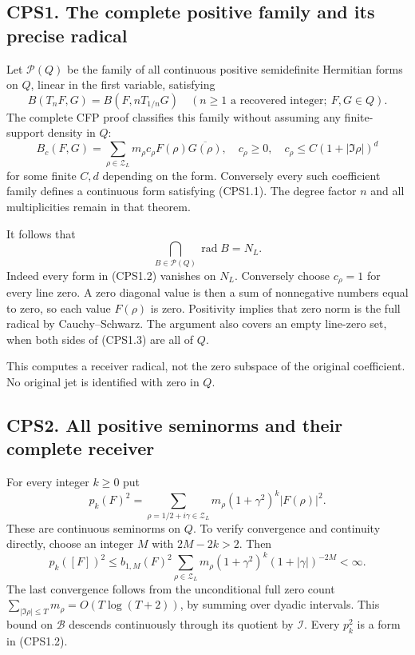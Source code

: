 \subsection{CPS1. The complete positive family and its precise
radical}\label{cps1.-the-complete-positive-family-and-its-precise-radical}

Let \(\mathscr P(Q)\) be the family of all continuous positive
semidefinite Hermitian forms on \(Q\), linear in the first variable,
satisfying \[
B(T_nF,G)=B(F,nT_{1/n}G)
\quad(n\ge1\text{ a recovered integer};\ F,G\in Q).
\tag{CPS1.1}
\] The complete CFP proof classifies this family without assuming any
finite-support density in \(Q\): \[
B_c(F,G)=\sum_{\rho\in\mathscr Z_L}
m_\rho c_\rho F(\rho)\overline{G(\rho)},
\quad c_\rho\ge0,\quad
c_\rho\le C(1+|\Im\rho|)^d
\tag{CPS1.2}
\] for some finite \(C,d\) depending on the form. Conversely every such
coefficient family defines a continuous form satisfying (CPS1.1). The
degree factor \(n\) and all multiplicities remain in that theorem.

It follows that \[
\bigcap_{B\in\mathscr P(Q)}\operatorname{rad}B=N_L.
\tag{CPS1.3}
\] Indeed every form in (CPS1.2) vanishes on \(N_L\). Conversely choose
\(c_\rho=1\) for every line zero. A zero diagonal value is then a sum of
nonnegative numbers equal to zero, so each value \(F(\rho)\) is zero.
Positivity implies that zero norm is the full radical by
Cauchy--Schwarz. The argument also covers an empty line-zero set, when
both sides of (CPS1.3) are all of \(Q\).

This computes a receiver radical, not the zero subspace of the original
coefficient. No original jet is identified with zero in \(Q\).

\subsection{CPS2. All positive seminorms and their complete
receiver}\label{cps2.-all-positive-seminorms-and-their-complete-receiver}

For every integer \(k\ge0\) put \[
p_k(F)^2=\sum_{\rho=1/2+i\gamma\in\mathscr Z_L}
m_\rho(1+\gamma^2)^k|F(\rho)|^2.
\tag{CPS2.1}
\] These are continuous seminorms on \(Q\). To verify convergence and
continuity directly, choose an integer \(M\) with \(2M-2k>2\). Then \[
p_k([F])^2\le b_{1,M}(F)^2
\sum_{\rho\in\mathscr Z_L}m_\rho(1+\gamma^2)^k
(1+|\gamma|)^{-2M}<\infty.
\tag{CPS2.2}
\] The last convergence follows from the unconditional full zero count
\(\sum_{|\Im\rho|\le T}m_\rho=O(T\log(T+2))\), by summing over dyadic
intervals. This bound on \(\mathcal B\) descends continuously through
its quotient by \(\mathcal I\). Every \(p_k^2\) is a form in (CPS1.2).

